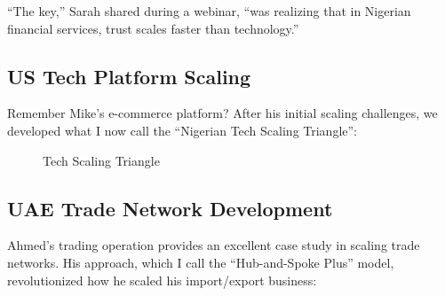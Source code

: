 ``The key,'' Sarah shared during a webinar, ``was realizing that in Nigerian financial services, trust scales faster than technology.''

\subsection{US Tech Platform Scaling}\label{subsec:us-tech-scaling}

Remember Mike's e-commerce platform? After his initial scaling challenges, we developed what I now call the ``Nigerian Tech Scaling Triangle'':

\begin{figure}[h]
    \centering
    \caption{Tech Scaling Triangle}
    \label{fig:tech-triangle}
\end{figure}

\subsection{UAE Trade Network Development}\label{subsec:uae-trade-development}

Ahmed's trading operation provides an excellent case study in scaling trade networks. His approach, which I call the ``Hub-and-Spoke Plus'' model, revolutionized how he scaled his import/export business:

